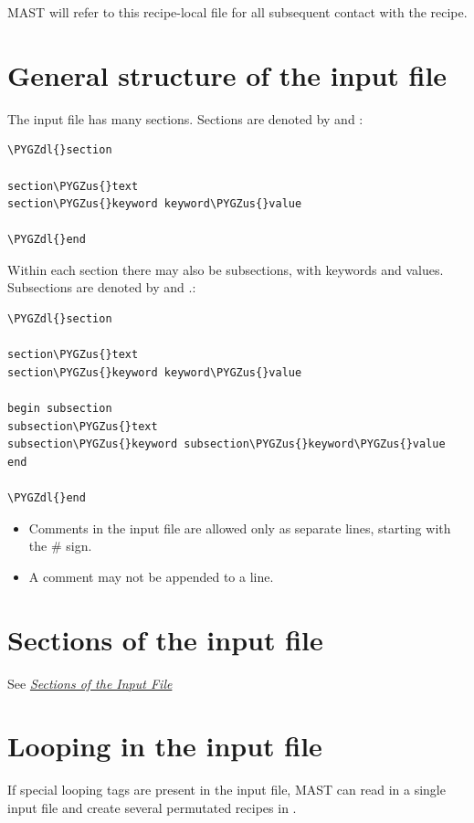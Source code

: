 \documentclass[letterpaper,10pt,english]{sphinxmanual}
\def\PYGZus{\char`\_}
\def\PYGZdl{\char`\$}
\begin{document}
MAST will refer to this recipe-local  file for all subsequent contact with the recipe.


\section{General structure of the input file}
\label{3_0_inputfile:general-structure-of-the-input-file}
The input file has many sections. Sections are denoted by  and :

\begin{Verbatim}[commandchars=\\\{\}]
\PYGZdl{}section

section\PYGZus{}text
section\PYGZus{}keyword keyword\PYGZus{}value

\PYGZdl{}end
\end{Verbatim}

Within each section there may also be subsections, with keywords and values.
Subsections are denoted by  and .:

\begin{Verbatim}[commandchars=\\\{\}]
\PYGZdl{}section

section\PYGZus{}text
section\PYGZus{}keyword keyword\PYGZus{}value

begin subsection
subsection\PYGZus{}text
subsection\PYGZus{}keyword subsection\PYGZus{}keyword\PYGZus{}value
end

\PYGZdl{}end
\end{Verbatim}
\begin{itemize}
\item {} 
Comments in the input file are allowed only as separate lines, starting with the \# sign.

\item {} 
A comment may not be appended to a line.

\end{itemize}


\section{Sections of the input file}
\label{3_0_inputfile:sections-of-the-input-file}
See {\hyperref[3_1_inputsections::doc]{\emph{Sections of the Input File}}}


\section{Looping in the input file}
\label{3_0_inputfile:looping-in-the-input-file}
If special looping tags are present in the input file, MAST can read in a single input file and create several permutated recipes in .
\end{document}
